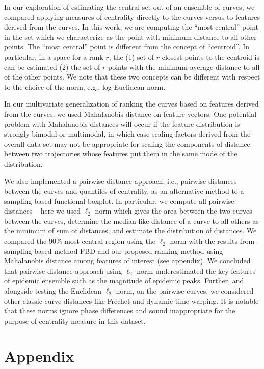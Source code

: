 \documentclass[fleqn,10pt,lineno]{wlpeerj}
\begin{document}
In our exploration of estimating the central set out of an ensemble of curves, we compared applying measures of centrality directly to the curves versus to features derived from the curves. In this work, we are computing the ``most central'' point in the set which we characterize as the point with minimum distance to all other points. The ``most central'' point is different from the concept of ``centroid''. In particular, in a space for a rank $r$, the (1) set of $r$ closest points to the centroid is can be estimated (2) the set of $r$ points with the minimum average distance to all of the other points. We note that these two concepts can be different with respect to the choice of the norm, e.g., log Euclidean norm.

In our multivariate generalization of ranking the curves based on features derived from the curves, we used Mahalanobis distance on feature vectors. One potential problem with Mahalanobis distances will occur if the feature distribution is strongly bimodal or multimodal, in which case scaling factors derived from the overall data set may not be appropriate for scaling the components of distance between two trajectories whose features put them in the same mode of the distribution.

We also implemented a pairwise-distance approach, i.e., pairwise distances between the curves and quantiles of centrality, as an alternative method to a sampling-based functional boxplot. In particular, we compute all pairwise distances -- here we used $\ell_2$ norm which gives the area between the two curves -- between the curves, determine the median-like distance of a curve to all others as the minimum of sum of distances, and estimate the distribution of distances. We compared the 90\% most central region using the $\ell_2$ norm with the results from sampling-based method FBD and our proposed ranking method using Mahalanobis distance among features of interest (see appendix). We concluded that pairwise-distance approach using $\ell_2$ norm underestimated the key features of epidemic ensemble such as the magnitude of epidemic peaks. Further, and alongside testing the Euclidean $\ell_2$ norm, on the pairwise curves, we considered other classic curve distances like Fréchet and dynamic time warping. It is notable that these norms ignore phase differences and sound inappropriate for the purpose of centrality measure in this dataset.



\section*{Appendix}
\end{document}
